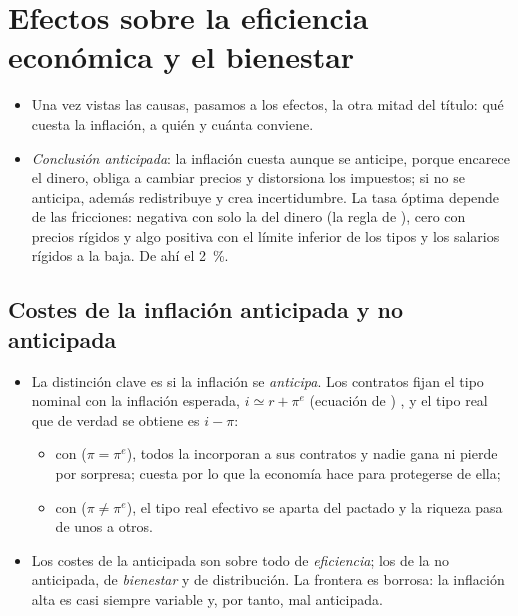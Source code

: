 \documentclass[11pt]{article}
\begin{document}
\section{Efectos sobre la eficiencia económica y el bienestar}\label{sec:efectos}

\begin{itemize}
\item Una vez vistas las causas, pasamos a los efectos, la otra mitad del título: qué cuesta la inflación, a quién y cuánta conviene.
\item \emph{Conclusión anticipada}: la inflación cuesta aunque se anticipe, porque encarece el dinero, obliga a cambiar precios y distorsiona los impuestos; si no se anticipa, además redistribuye y crea incertidumbre. La tasa óptima depende de las fricciones: negativa con solo la del dinero (la regla de ), cero con precios rígidos y algo positiva con el límite inferior de los tipos y los salarios rígidos a la baja. De ahí el 2~\%.
\end{itemize}

\subsection{Costes de la inflación anticipada y no anticipada}\label{sec:costes-inflacion}

\begin{itemize}
\item La distinción clave es si la inflación se \emph{anticipa}. Los contratos fijan el tipo nominal con la inflación esperada, $i\simeq r+\pi^e$ (ecuación de ) , y el tipo real que de verdad se obtiene es $i-\pi$:
  \begin{itemize}
  \item con  ($\pi=\pi^e$), todos la incorporan a sus contratos y nadie gana ni pierde por sorpresa; cuesta por lo que la economía hace para protegerse de ella;
  \item con  ($\pi\neq\pi^e$), el tipo real efectivo se aparta del pactado y la riqueza pasa de unos a otros.
  \end{itemize}
\item Los costes de la anticipada son sobre todo de \emph{eficiencia}; los de la no anticipada, de \emph{bienestar} y de distribución. La frontera es borrosa: la inflación alta es casi siempre variable y, por tanto, mal anticipada\nocite{Friedman1977Nobel}.
\end{itemize}
\end{document}
